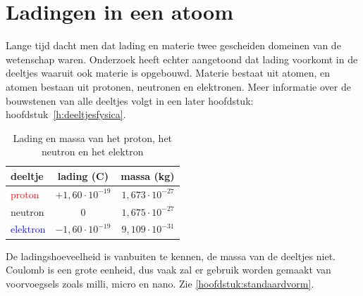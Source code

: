 \documentclass{ximera}
\begin{document}
\section{Ladingen in een atoom}

Lange tijd dacht men dat lading en materie twee gescheiden domeinen van de wetenschap waren. Onderzoek heeft echter aangetoond dat lading voorkomt in de deeltjes waaruit ook materie is opgebouwd. Materie bestaat uit atomen, en atomen bestaan uit protonen, neutronen en elektronen. Meer informatie over de bouwstenen van alle deeltjes volgt in een later hoofdstuk: hoofdstuk~\ref{h:deeltjesfysica}.


\begin{table}[h!]
\caption{Lading en massa van het proton, het neutron en het elektron}
\centering
\begin{tabular}{@{}lcr@{}}
	\toprule
	deeltje & lading (C) & massa (kg)\\
	\midrule
	\textcolor{red}{proton} & $+1,60\cdot 10^{-19}$ & $1,673\cdot 10^{-27}$ \\
	neutron & 0 & $1,675\cdot 10^{-27}$ \\
	\textcolor{blue}{elektron} & $-1,60\cdot 10^{-19}$ & $9,109\cdot 10^{-31}$ \\
	\bottomrule
\end{tabular}
\vspace{2mm}
	\begin{remark}
		De ladingshoeveelheid is vanbuiten te kennen, de massa van de deeltjes niet. Coulomb is een grote eenheid, dus vaak zal er gebruik worden gemaakt van voorvoegsels zoals milli, micro en nano. Zie \ref{hoofdstuk:standaardvorm}.%
	\end{remark}
\end{table}
\end{document}
